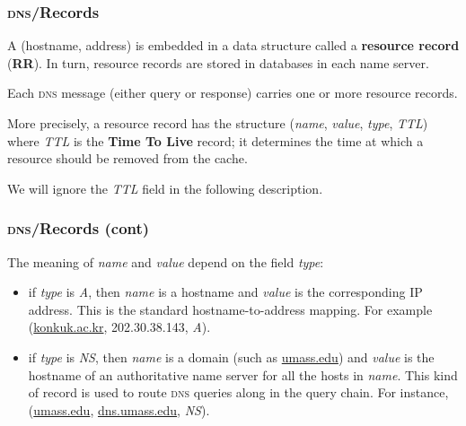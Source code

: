 %
\begin{frame}
\frametitle{\textsc{dns}/Records}

A (hostname, address) is embedded in a data structure called a
\textbf{resource record} (\textbf{RR}). In turn, resource records are
stored in databases in each name server.

Each \textsc{dns} message (either query or response) carries one or
more resource records.

More precisely, a resource record has the structure (\emph{name},
\emph{value}, \emph{type}, \emph{TTL}) where \emph{TTL} is the
\textbf{Time To Live} record; it determines the time at which a
resource should be removed from the cache.

We will ignore the \emph{TTL} field in the following description.

\end{frame}

%
\begin{frame}
\frametitle{\textsc{dns}/Records (cont)}

The meaning of \emph{name} and \emph{value} depend on the field
\emph{type}:

\begin{itemize}

  \item if \emph{type} is \emph{A}, then \emph{name} is a hostname and
  \emph{value} is the corresponding IP address. This is the standard
  hostname-to-address mapping. For example (\url{konkuk.ac.kr},
  202.30.38.143, \emph{A}).

  \item if \emph{type} is \emph{NS}, then \emph{name} is a domain
  (such as \url{umass.edu}) and \emph{value} is the hostname of an
  authoritative name server for all the hosts in \emph{name}. This
  kind of record is used to route \textsc{dns} queries along in the
  query chain. For instance, (\url{umass.edu}, \url{dns.umass.edu},
  \emph{NS}).

\end{itemize}

\end{frame}

